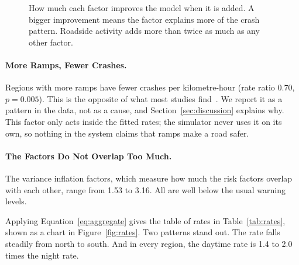 \documentclass[11pt]{article}
\begin{document}
\begin{figure}[htbp]
\centering
{}
\caption{How much each factor improves the model when it is added. A bigger
improvement means the factor explains more of the crash pattern. Roadside
activity adds more than twice as much as any other factor.}
\label{fig:aic}
\end{figure}

\paragraph{More Ramps, Fewer Crashes.}
Regions with more ramps have fewer crashes per kilometre-hour (rate ratio 0.70,
$p=0.005$). This is the opposite of what most studies find~\cite{park2010}. We
report it as a pattern in the data, not as a cause, and
Section~\ref{sec:discussion} explains why. This factor only acts inside the
fitted rates; the simulator never uses it on its own, so nothing in the system
claims that ramps make a road safer.

\paragraph{The Factors Do Not Overlap Too Much.}
The variance inflation factors, which measure how much the risk factors overlap
with each other, range from 1.53 to 3.16. All are well below the usual warning
levels.

Applying Equation~\eqref{eq:aggregate} gives the table of rates in
Table~\ref{tab:rates}, shown as a chart in Figure~\ref{fig:rates}. Two patterns
stand out. The rate falls steadily from north to south. And in every region,
the daytime rate is 1.4 to 2.0 times the night rate.
\end{document}
